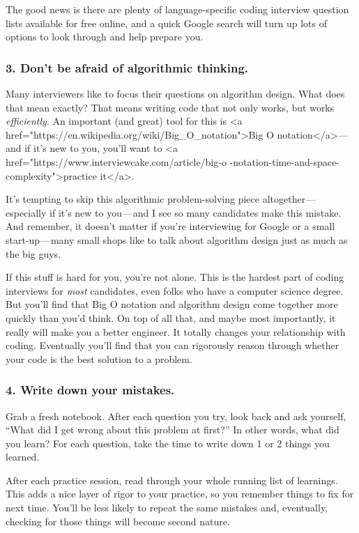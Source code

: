 \documentclass[a4paper,12pt]{article}
\begin{document}
The good news is there are plenty of language-specific coding interview
question lists available for free online, and a quick Google search will turn
up lots of options to look through and help prepare you.

\subsubsection*{3. Don’t be afraid of algorithmic thinking.}

Many interviewers like to focus their questions on algorithm design. What does
that mean exactly? That means writing code that not only works, but works
\emph{ef\kern0pt{}ficiently}. An important (and great) tool for this is <a href="https://en.wikipedia.org/wiki/Big_O_notation">Big O
notation</a> — and if it’s new to
you, you’ll want to <a href="https://www.interviewcake.com/article/big-o
-notation-time-and-space-complexity">practice it</a>.

It’s tempting to skip this algorithmic problem-solving piece altogether —
especially if it’s new to you — and I see so many candidates make this
mistake. And remember, it doesn’t matter if you’re interviewing for Google or
a small start-up — many small shops like to talk about algorithm design just
as much as the big guys.

If this stuf\kern0pt{}f is hard for you, you’re not alone. This is the hardest part of
coding interviews for \emph{most} candidates, even folks who have a computer
science degree. But you’ll find that Big O notation and algorithm design come
together more quickly than you’d think. On top of all that, and maybe most
importantly, it really will make you a better engineer. It totally changes
your relationship with coding. Eventually you’ll find that you can rigorously
reason through whether your code is the best solution to a problem.

\subsubsection*{4. Write down your mistakes.}

Grab a fresh notebook. After each question you try, look back and ask
yourself, “What did I get wrong about this problem at first?” In other words,
what did you learn? For each question, take the time to write down 1 or 2
things you learned.

After each practice session, read through your whole running list of
learnings. This adds a nice layer of rigor to your practice, so you remember
things to fix for next time. You’ll be less likely to repeat the same mistakes
and, eventually, checking for those things will become second nature.
\end{document}
